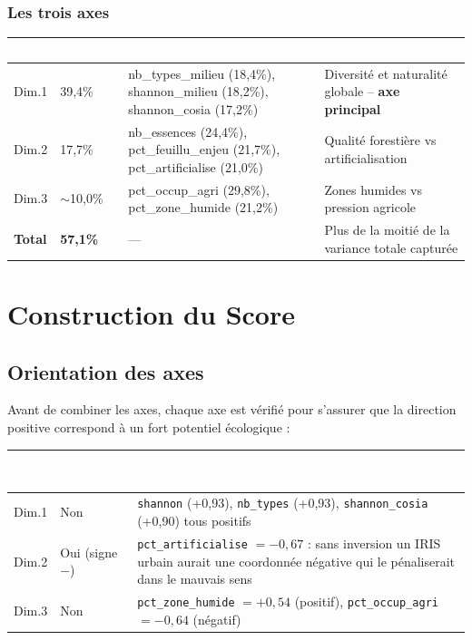 \documentclass[12pt,a4paper]{report}
\begin{document}
\vspace{0.4cm}
\subsubsection*{Les trois axes}

\begin{tabularx}{\textwidth}{L{1.5cm} L{1.8cm} L{5cm} X}
  \toprule
  \textcolor{white}{\textbf{Axe}} &
  \textcolor{white}{\textbf{Variance}} &
  \textcolor{white}{\textbf{Variables dominantes}} &
  \textcolor{white}{\textbf{Interprétation}} \\
  \midrule
  Dim.1 & 39,4\% &
    nb\_types\_milieu (18,4\%), shannon\_milieu (18,2\%), shannon\_cosia (17,2\%) &
    Diversité et naturalité globale -- \textbf{axe principal} \\
  Dim.2 & 17,7\% &
    nb\_essences (24,4\%), pct\_feuillu\_enjeu (21,7\%), pct\_artificialise (21,0\%) &
    Qualité forestière vs artificialisation \\
  Dim.3 & $\sim$10,0\% &
    pct\_occup\_agri (29,8\%), pct\_zone\_humide (21,2\%) &
    Zones humides vs pression agricole \\
  \textbf{Total} & \textbf{57,1\%} & --- &
    Plus de la moitié de la variance totale capturée \\
  \bottomrule
\end{tabularx}

\section{Construction du Score}

\subsection{Orientation des axes}

Avant de combiner les axes, chaque axe est vérifié pour s'assurer que la direction positive correspond à un fort potentiel écologique :

\begin{tabularx}{\textwidth}{L{1.5cm} L{1.8cm} X}
  \toprule
  \textcolor{white}{\textbf{Axe}} &
  \textcolor{white}{\textbf{Inversion ?}} &
  \textcolor{white}{\textbf{Justification}} \\
  \midrule
  Dim.1 & Non &
    \texttt{shannon} (+0,93), \texttt{nb\_types} (+0,93), \texttt{shannon\_cosia} (+0,90) tous positifs \\
  Dim.2 & Oui (signe $-$) &
    \texttt{pct\_artificialise} $= -0{,}67$ : sans inversion un IRIS urbain aurait une coordonnée négative qui le pénaliserait dans le mauvais sens \\
  Dim.3 & Non &
    \texttt{pct\_zone\_humide} $= +0{,}54$ (positif), \texttt{pct\_occup\_agri} $= -0{,}64$ (négatif) \\
  \bottomrule
\end{tabularx}
\end{document}
